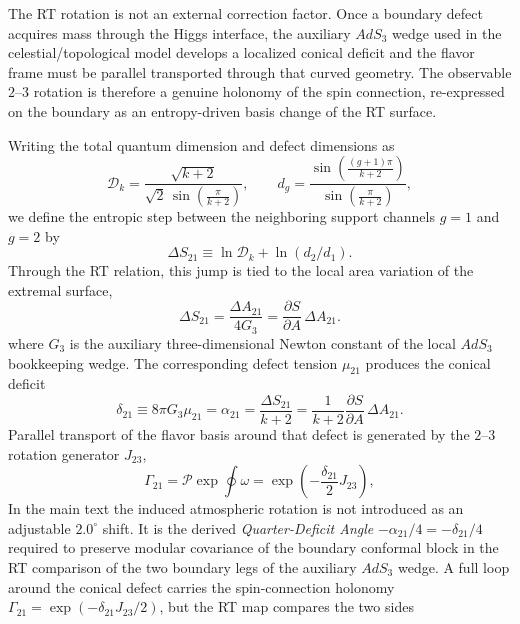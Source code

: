 \documentclass[11pt]{article}
\newcommand{\cD}{\mathcal{D}}
\begin{document}
The RT rotation is not an external correction factor. Once a boundary defect acquires mass through the Higgs interface, the auxiliary $AdS_3$ wedge used in the celestial/topological model develops a localized conical deficit and the flavor frame must be parallel transported through that curved geometry. The observable $2$--$3$ rotation is therefore a genuine holonomy of the spin connection, re-expressed on the boundary as an entropy-driven basis change of the RT surface.

Writing the total quantum dimension and defect dimensions as
\begin{equation}
 \cD_k = \frac{\sqrt{k+2}}{\sqrt{2}\,\sin\!\left(\frac{\pi}{k+2}\right)},
 \qquad
 d_g = \frac{\sin\!\left(\frac{(g+1)\pi}{k+2}\right)}{\sin\!\left(\frac{\pi}{k+2}\right)},
\end{equation}
we define the entropic step between the neighboring support channels $g=1$ and $g=2$ by
\begin{equation}
 \Delta S_{21} \equiv \ln \cD_k + \ln(d_2/d_1).
\end{equation}
Through the RT relation, this jump is tied to the local area variation of the extremal surface,
\begin{equation}
 \Delta S_{21}
 =
 \frac{\Delta A_{21}}{4G_3}
 =
 \frac{\partial S}{\partial A}\,\Delta A_{21}.
\end{equation}
where $G_3$ is the auxiliary three-dimensional Newton constant of the local $AdS_3$ bookkeeping wedge. The corresponding defect tension $\mu_{21}$ produces the conical deficit
\begin{equation}
 \delta_{21}
 \equiv
 8\pi G_3\mu_{21}
 =
 \alpha_{21}
 = \frac{\Delta S_{21}}{k+2}
 = \frac{1}{k+2}\frac{\partial S}{\partial A}\,\Delta A_{21}.
\end{equation}
Parallel transport of the flavor basis around that defect is generated by the $2$--$3$ rotation generator $J_{23}$,
\begin{equation}
 \Gamma_{21}
 = \mathcal P\exp\!\oint \omega
 = \exp\!\left(-\frac{\delta_{21}}{2}J_{23}\right),
\end{equation}
In the main text the induced atmospheric rotation is not introduced as an
adjustable $2.0^{\circ}$ shift. It is the derived \emph{Quarter-Deficit Angle}
$-\alpha_{21}/4=-\delta_{21}/4$ required to preserve modular covariance of the
boundary conformal block in the RT comparison of the two boundary legs of the
auxiliary $AdS_3$ wedge.
A full loop around the conical defect carries the spin-connection holonomy
$\Gamma_{21}=\exp(-\delta_{21}J_{23}/2)$, but the RT map compares the two sides
\end{document}
